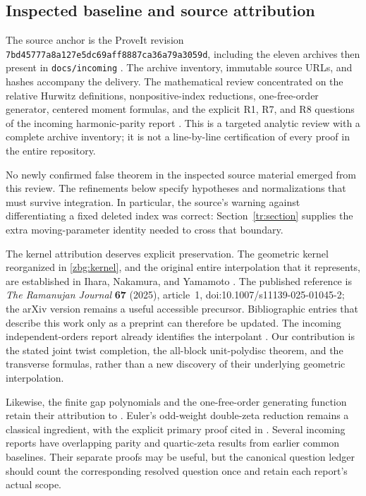 \documentclass[11pt,letterpaper]{article}
\numberwithin{equation}{section}
\theoremstyle{plain}
\theoremstyle{definition}
\theoremstyle{remark}
\newcommand{\src}[1]{\nolinkurl{#1}}
\begin{document}
\subsection{Inspected baseline and source attribution}

The source anchor is the ProveIt revision
\src{7bd45777a8a127e5dc69aff8887ca36a79a3059d}, including the eleven
archives then present in \src{docs/incoming} \cite{Repository}.
The archive inventory, immutable source URLs, and hashes accompany
the delivery.  The mathematical review concentrated on the relative
Hurwitz definitions, nonpositive-index reductions, one-free-order
generator, centered moment formulas, and the explicit R1, R7, and R8
questions of the incoming harmonic-parity report
\cite{IncomingParity,IncomingIndependent}.  This is a targeted analytic
review with a complete archive inventory; it is not a line-by-line
certification of every proof in the entire repository.

No newly confirmed false theorem in the inspected source material
emerged from this review.  The refinements below specify hypotheses and
normalizations that must survive integration.  In particular, the
source's warning against differentiating a fixed deleted index was
correct: Section~\ref{tr:section} supplies the extra moving-parameter
identity needed to cross that boundary.

The kernel attribution deserves explicit preservation.  The geometric
kernel reorganized in \eqref{zbg:kernel}, and the original entire
interpolation that it represents, are established in Ihara, Nakamura,
and Yamamoto \cite[Proposition~3.3 and Theorem~4.1]{INY}.  The published
reference is \emph{The Ramanujan Journal} \textbf{67} (2025), article~1,
doi:10.1007/s11139-025-01045-2; the arXiv version remains a useful
accessible precursor.  Bibliographic entries that describe this work
only as a preprint can therefore be updated.  The incoming
independent-orders report already identifies the interpolant
\cite{IncomingIndependent}.  Our contribution is the stated joint
twist completion, the all-block unit-polydisc theorem, and the
transverse formulas, rather than a new discovery of their underlying
geometric interpolation.

Likewise, the finite gap polynomials and the one-free-order generating
function retain their attribution to \cite{IncomingParity}.  Euler's
odd-weight double-zeta reduction remains a classical ingredient,
with the explicit primary proof cited in \cite{Bradley2007}.
Several incoming reports have overlapping parity and quartic-zeta
results from earlier common baselines.  Their separate proofs may be
useful, but the canonical question ledger should count the corresponding
resolved question once and retain each report's actual scope.
\end{document}
